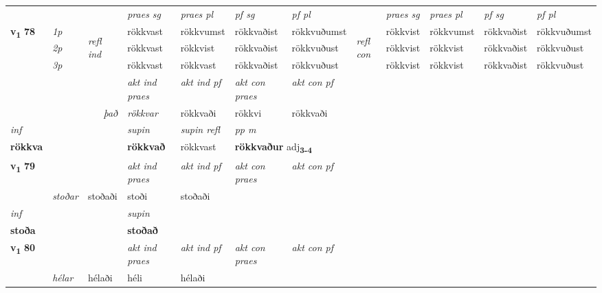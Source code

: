 \begin{longtable}[l]{X>{\footnotesize\itshape}llXXXXlXXXX}
 & &   & \textit{praes sg}  & \textit{praes pl}    & \textit{ pf sg} & \textit{pf pl} & & \textit{praes sg}  & \textit{praes pl}    & \textit{pf sg} & \textit{pf pl }  \\ \cmidrule{4-7} \cmidrule{9-12}
 \multirow{2}{*}{{{\textbf{v{\textsubscript{1}}} \Large{\textbf{78}}}}}  & 1p & \multirow{3}{*}{\begin{turn}{90}\textit{refl ind}\end{turn}}  & rökkvast & rökkvumst & rökkvaðist & rökkvuðumst & \multirow{3}{*}{\begin{turn}{90}\textit{refl con}\end{turn}}  &rökkvist & rökkvumst & rökkvaðist & rökkvuðumst \\*
 & 2p &  & rökkvast & rökkvist & rökkvaðist & rökkvuðust & &rökkvist & rökkvist & rökkvaðist & rökkvuðust \\*
 & 3p  & & rökkvast & rökkvast & rökkvaðist & rökkvuðust & & rökkvist & rökkvist& rökkvaðist & rökkvuðust \\*
\cmidrule{4-7} \cmidrule{9-12}

   && &  \textit{akt ind praes} & \textit{akt ind pf} & \textit{akt con praes} & \textit{akt con pf} \\*
\multicolumn{3}{r}{\textit{það}} & rökkvar & rökkvaði & rökkvi & rökkvaði \\*

\cmidrule{4-7}
   {\textit{inf}} & &      & \textit{supin} & \textit{supin refl} & \textit{pp m} \\*
  {\textbf{rökkva}} & &      &  \textbf{rökkvað} & rökkvast & \multicolumn{2}{l}{\textbf{rökkvaður} adj\textbf{\textsubscript{3-4}}} \\*

\midrule

\multirow{2}{*}{{{\textbf{v{\textsubscript{1}}} \Large{\textbf{79}}}}}  &&&  \textit{akt ind praes} & \textit{akt ind pf} & \textit{akt con praes} & \textit{akt con pf} \\*
\multicolumn{3}{r}{\textit{e-n}} & stoðar & stoðaði & stoði & stoðaði \\*

\cmidrule{4-7}
   {\textit{inf}} & &      & \textit{supin}   \\*
  {\textbf{stoða}} & &      &  \textbf{stoðað}   \\*

\midrule

\multirow{2}{*}{{{\textbf{v{\textsubscript{1}}} \Large{\textbf{80}}}}}  &&&  \textit{akt ind praes} & \textit{akt ind pf} & \textit{akt con praes} & \textit{akt con pf} \\*
\multicolumn{3}{r}{\textit{e-n / það}} & hélar & hélaði & héli & hélaði \\*


\end{longtable}
